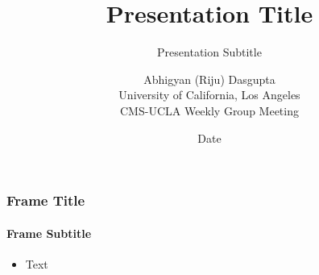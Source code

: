 \documentclass{beamer}
\title{Presentation Title}
\subtitle{Presentation Subtitle}
\author[Abhigyan (Riju) Dasgupta]{
	Abhigyan (Riju) Dasgupta \\
	\scriptsize University of California, Los Angeles\\[1em]
	\scriptsize CMS-UCLA Weekly Group Meeting
}
\date{Date}
\begin{document}
	\frame{\titlepage}


	\begin{frame}
		\frametitle{Frame Title}
		\framesubtitle{Frame Subtitle}
		\begin{itemize}
			\item Text
		\end{itemize}
	\end{frame}
\end{document}
